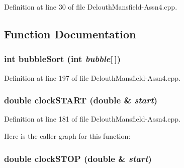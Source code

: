 Definition at line 30 of file DelouthMansfield-\/Assn4.cpp.



\subsection{Function Documentation}
\hypertarget{_delouth_mansfield-_assn4_8cpp_a8bb793ac49cd588089713622d18a8c5b}{
\subsubsection[{bubbleSort}]{\setlength{\rightskip}{0pt plus 5cm}int bubbleSort (int {\em bubble}\mbox{[}$\,$\mbox{]})}}
\label{_delouth_mansfield-_assn4_8cpp_a8bb793ac49cd588089713622d18a8c5b}


Definition at line 197 of file DelouthMansfield-\/Assn4.cpp.

\hypertarget{_delouth_mansfield-_assn4_8cpp_a06f37e9c6b6ed29e8670520afd7cb595}{
\subsubsection[{clockSTART}]{\setlength{\rightskip}{0pt plus 5cm}double clockSTART (double \& {\em start})}}
\label{_delouth_mansfield-_assn4_8cpp_a06f37e9c6b6ed29e8670520afd7cb595}


Definition at line 181 of file DelouthMansfield-\/Assn4.cpp.



Here is the caller graph for this function:

\hypertarget{_delouth_mansfield-_assn4_8cpp_aac62ee236b316f39c25e76417c30c4e7}{
\subsubsection[{clockSTOP}]{\setlength{\rightskip}{0pt plus 5cm}double clockSTOP (double \& {\em start})}}
\label{_delouth_mansfield-_assn4_8cpp_aac62ee236b316f39c25e76417c30c4e7}


